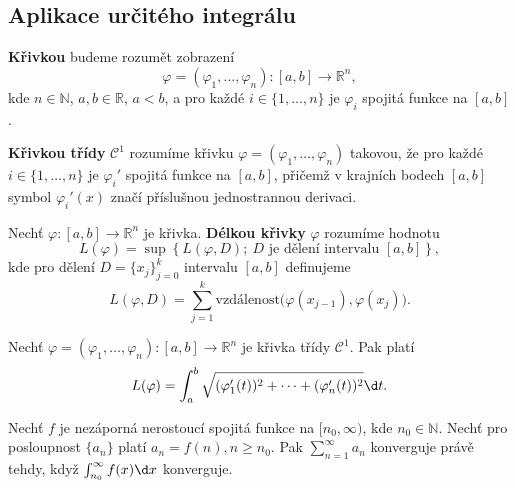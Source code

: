 \subsection{Aplikace určitého integrálu}
\begin{definice}
\textbf{Křivkou} budeme rozumět zobrazení
\[
\varphi = (\varphi_1, \dots, \varphi_n) : [a, b] \to \mathbb{R}^n,
\]
kde $n \in \mathbb{N}$, $a, b \in \mathbb{R}$, $a < b$, a pro každé $i \in \{1, \dots, n\}$ je $\varphi_i$ spojitá funkce na $[a, b]$.

\textbf{Křivkou třídy} $\mathcal C^1$ rozumíme křivku
$
\varphi = (\varphi_1, \dots, \varphi_n)
$
takovou, že pro každé $i \in \{1, \dots, n\}$ je $\varphi_i'$ spojitá funkce na $[a, b]$, přičemž v krajních bodech $[a, b]$ symbol $\varphi_i'(x)$ značí příslušnou jednostrannou derivaci.
\end{definice}

\begin{definice}
Nechť $\varphi : [a, b] \to \mathbb{R}^n$ je křivka. \textbf{Délkou křivky} $\varphi$ rozumíme hodnotu
\[
L(\varphi)
=
\sup
\left\{
L(\varphi,D); \ D \text{ je dělení intervalu } [a,b]
\right\},
\]
kde pro dělení $D = \{x_j\}_{j=0}^k$ intervalu $[a,b]$ definujeme
\[
L(\varphi,D)
=
\sum_{j=1}^k
\text{vzdálenost}
\bigl(
\varphi(x_{j-1}), \varphi(x_j)
\bigr).
\]
\end{definice}

\begin{veta}\label{veta8.41}
Nechť
$
\varphi = (\varphi_1, \dots, \varphi_n) : [a,b] \to \mathbb{R}^n
$
je křivka třídy $\mathcal C^1$. Pak platí
\[
L(\varphi)
=
\int_a^b
\sqrt{
(\varphi_1'(t))^2
+
\cdots
+
(\varphi_n'(t))^2
}
\d t.
\]
\end{veta}

\begin{veta}\label{veta8.42}
Nechť $f$ je nezáporná nerostoucí spojitá funkce na $[n_0,\infty)$, kde $n_0 \in \mathbb{N}$. Nechť pro posloupnost $\{a_n\}$ platí
$
a_n = f(n),  n \geq n_0.
$
Pak
$
\sum_{n=1}^\infty a_n
$
konverguje právě tehdy, když
$
\int_{n_0}^\infty f(x)\d x
$
konverguje.
\end{veta}
